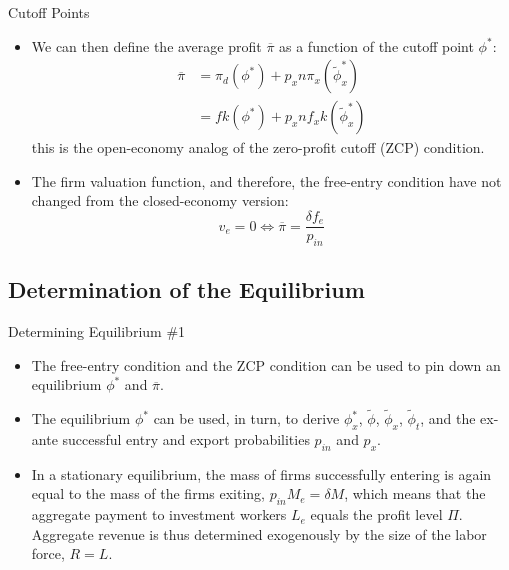 \documentclass[aspectratio=169]{beamer}
\begin{document}
\begin{frame}{Cutoff Points}

\begin{itemize}
    \item<1-> We can then define the average profit $ \overline{\pi} $ as a function of the cutoff point $ \phi^{*} $:
    \begin{equation}
        \begin{split}
            \overline{\pi} &= \pi_{d}\left( \phi^{*} \right) + p_{x} n \pi_{x}\left( \tilde{\phi}_{x}^{*} \right) \\
            &= f k\left( \phi^{*} \right) + p_{x} n f_{x} k\left( \tilde{\phi}_{x}^{*} \right)
        \end{split}
        \label{eq:ZCPopen}
    \end{equation}
    this is the open-economy analog of the zero-profit cutoff (ZCP) condition.
    \item<2-> The firm valuation function, and therefore, the free-entry condition have not changed from the closed-economy version:
    \begin{equation*}
        v_{e} = 0 \Leftrightarrow \overline{\pi} = \frac{\delta f_{e}}{p_{in}}
    \end{equation*}
\end{itemize}
    
\end{frame}


\subsection{Determination of the Equilibrium}


\begin{frame}{Determining Equilibrium \#1}

\begin{itemize}
    \item<1-> The free-entry condition and the ZCP condition can be used to pin down an equilibrium $ \phi^{*} $ and $ \overline{\pi} $.
    \item<2-> The equilibrium $ \phi^{*} $ can be used, in turn, to derive $ \phi_{x}^{*} $, $ \tilde{\phi} $, $ \tilde{\phi}_{x} $, $ \tilde{\phi}_{t} $, and the ex-ante successful entry and export probabilities $ p_{in} $ and $ p_{x} $.
    \item<3-> In a stationary equilibrium, the mass of firms successfully entering is again equal to the mass of the firms exiting, $ p_{in} M_{e} = \delta M $, which means that the aggregate payment to investment workers $ L_{e} $ equals the profit level $ \Pi $.  Aggregate revenue is thus determined exogenously by the size of the labor force, $ R = L $. 
\end{itemize}

\end{frame}
\end{document}
